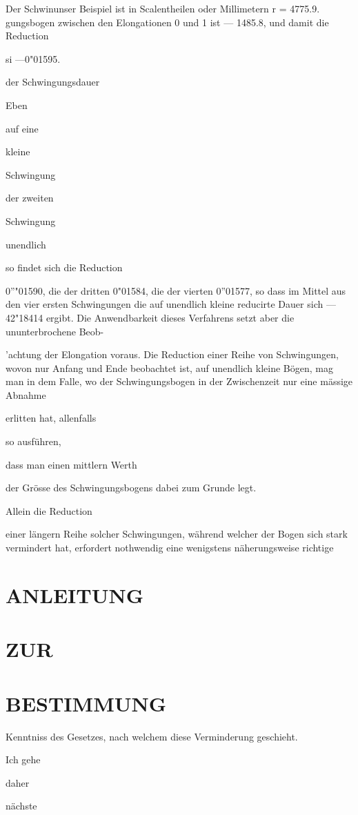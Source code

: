 \documentclass[12pt,a4paper]{article}
\begin{document}
Der Schwinunser Beispiel ist in Scalentheilen oder Millimetern r = 4775.9. gungsbogen zwischen den Elongationen 0 und 1 ist — 1485.8, und damit die Reduction

si —0"01595.

der Schwingungsdauer

Eben

auf eine

kleine

Schwingung

der zweiten

Schwingung

unendlich

so findet sich die Reduction

0”"01590, die der dritten 0"01584, die der vierten 0”01577, so dass im Mittel aus den vier ersten Schwingungen die auf unendlich kleine reducirte Dauer sich — 42"18414 ergibt. Die Anwendbarkeit dieses Verfahrens setzt aber die ununterbrochene Beob-

'achtung der Elongation voraus. Die Reduction einer Reihe von Schwingungen, wovon nur Anfang und Ende beobachtet ist, auf unendlich kleine Bögen, mag man in dem Falle, wo der Schwingungsbogen in der Zwischenzeit nur eine mässige Abnahme

erlitten hat, allenfalls

so ausführen,

dass man einen mittlern Werth

der Grösse des Schwingungsbogens dabei zum Grunde legt.

Allein die Reduction

einer längern Reihe solcher Schwingungen, während welcher der Bogen sich stark vermindert hat, erfordert nothwendig eine wenigstens näherungsweise richtige

\section*{ANLEITUNG}
\section*{ZUR}
\section*{BESTIMMUNG}
Kenntniss des Gesetzes, nach welchem diese Verminderung geschieht.

Ich gehe

daher

nächste
\end{document}
